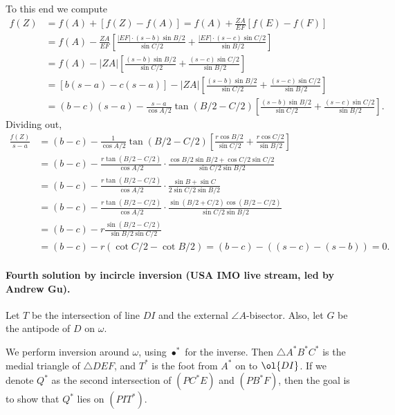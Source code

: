 To this end we compute
\begin{align*}
  f(Z) &= f(A) + \left[ f(Z) - f(A) \right]
    = f(A) + \frac{ZA}{EF} \left[ f(E)-f(F) \right] \\
  &= f(A) - \frac{ZA}{EF}
  \left[ \frac{|EF| \cdot (s-b) \sin B/2}{\sin C/2}
    + \frac{|EF| \cdot (s-c) \sin C/2}{\sin B/2} \right] \\
  &= f(A) - |ZA| \left[ \frac{(s-b) \sin B/2}{\sin C/2}
    + \frac{(s-c) \sin C/2}{\sin B/2} \right] \\
  &= \left[ b(s-a) - c(s-a) \right]
    - |ZA| \left[ \frac{(s-b) \sin B/2}{\sin C/2}
    + \frac{(s-c) \sin C/2}{\sin B/2} \right] \\
  &= (b-c)(s-a) - \frac{s-a}{\cos A/2} \tan (B/2-C/2)
    \left[ \frac{(s-b) \sin B/2}{\sin C/2}
    + \frac{(s-c) \sin C/2}{\sin B/2} \right].
\end{align*}
Dividing out,
\begin{align*}
  \frac{f(Z)}{s-a}
  &= (b-c) - \frac{1}{\cos A/2} \tan (B/2-C/2)
    \left[ \frac{r \cos B/2}{\sin C/2}
      + \frac{r \cos C/2}{\sin B/2} \right] \\
  &= (b-c) - \frac{r \tan(B/2-C/2)}{\cos A/2}
    \cdot \frac{\cos B/2 \sin B/2 + \cos C/2 \sin C/2}%
    {\sin C/2 \sin B/2} \\
  &= (b-c) - \frac{r \tan(B/2-C/2)}{\cos A/2}
    \cdot \frac{\sin B + \sin C}%
    {2\sin C/2 \sin B/2} \\
  &= (b-c) - \frac{r \tan(B/2-C/2)}{\cos A/2}
    \cdot \frac{\sin(B/2+C/2)\cos(B/2-C/2)}
    {\sin C/2 \sin B/2} \\
  &= (b-c) - r \frac{\sin(B/2-C/2)}{\sin B/2 \sin C/2} \\
  &= (b-c) - r(\cot C/2 - \cot B/2)
    = (b-c) - \left( (s-c) - (s-b) \right) = 0.
\end{align*}

\paragraph{Fourth solution by incircle inversion (USA IMO live stream, led by Andrew Gu).}
Let $T$ be the intersection of line $DI$ and the external $\angle A$-bisector.
Also, let $G$ be the antipode of $D$ on $\omega$.

We perform inversion around $\omega$, using $\bullet^\ast$ for the inverse.
Then $\triangle A^\ast B^\ast C^\ast$ is the medial triangle of $\triangle DEF$,
and $T^\ast$ is the foot from $A^\ast$ on to $\ol{DI}$.
If we denote $Q^\ast$ as the second intersection
of $(PC^\ast E)$ and $(PB^\ast F)$,
then the goal is to show that $Q^\ast$ lies on $(PIT^\ast)$.

